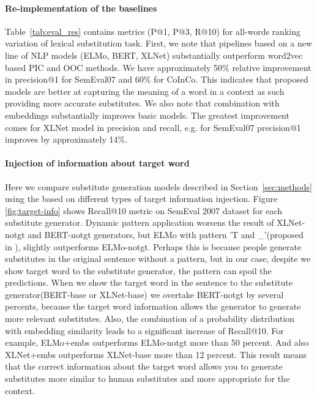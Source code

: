 \documentclass[11pt,a4paper]{article}
\begin{document}

\paragraph{Re-implementation of the baselines}

Table~\ref{tab:eval_res} contains metrics (P@1, P@3, R@10) for all-words ranking variation of lexical substitution task. First, we note that pipelines based on a new line of NLP models (ELMo, BERT, XLNet) substantially outperform word2vec based PIC and OOC methods. We have approximately 50\% relative improvement in precision@1 for SemEval07 and 60\% for CoInCo. This indicates that proposed models are better at capturing the meaning of a word in a context as such providing more accurate substitutes. We also note that combination with embeddings substantially improves basic models. The greatest improvement comes for XLNet model in precision and recall, e.g. for SemEval07 precision@1 improves by approximately 14\%.


\paragraph{Injection of information about target word}

Here we compare substitute generation models described in Section~\ref{sec:methods} using the based on different types of target information injection. Figure \ref{fig:target-info} shows Recall@10 metric on SemEval 2007 \cite{mccarthy-navigli-2007-semeval} dataset for each substitute generator. Dynamic pattern application worsens the result of XLNet-notgt and BERT-notgt generators, but ELMo with pattern 'T and \_'(proposed in \cite{amrami-2018}), slightly outperforms ELMo-notgt. Perhaps this is because people generate substitutes in the original sentence without a pattern, but in our case, despite we show target word to the substitute generator, the pattern can spoil the predictions. When we show the target word in the sentence to the substitute generator(BERT-base or XLNet-base) we overtake BERT-notgt by several percents, because the target word information allows the generator to generate more relevant substitutes. Also, the combination of a probability distribution with embedding similarity leads to a significant increase of Recall@10. For example, ELMo+embs outperforms ELMo-notgt more than 50 percent. And also XLNet+embs outperforms XLNet-base more than 12 percent. This result means that the correct information about the target word allows you to generate substitutes more similar to human substitutes and more appropriate for the context.
\end{document}
